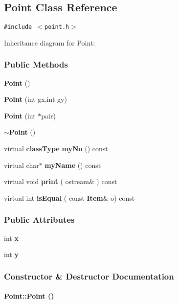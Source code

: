 \subsection{Point  Class Reference}
\label{Point}
{\tt \#include $<$point.h$>$}

Inheritance diagram for Point:\begin{figure}[H]
\begin{center}
\leavevmode
\setlength{\epsfysize}{4cm}
\end{center}
\end{figure}
\subsubsection*{Public Methods}
\begin{CompactItemize}
\item 
{\bf Point} ()
\item 
{\bf Point} (int gx,int gy)
\item 
{\bf Point} (int $\ast$pair)
\item 
{\bf $\sim$Point} ()
\item 
virtual {\bf class\-Type} {\bf my\-No} () const
\item 
virtual char$\ast$ {\bf my\-Name} () const
\item 
virtual void {\bf print} ( ostream\& ) const
\item 
virtual int {\bf is\-Equal} ( const {\bf Item}\& o) const
\end{CompactItemize}
\subsubsection*{Public Attributes}
\begin{CompactItemize}
\item 
int {\bf x}
\item 
int {\bf y}
\end{CompactItemize}


\subsubsection{Constructor \& Destructor Documentation}
\label{Point_a0}
\paragraph{\setlength{\rightskip}{0pt plus 5cm}Point::Point ()\hspace{0.3cm}{\tt  [inline]}}\hfill



